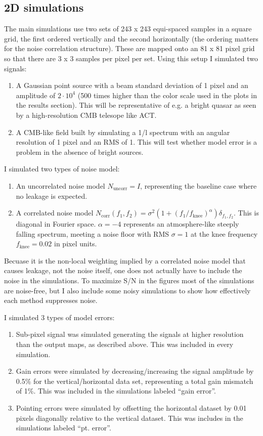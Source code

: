 \documentclass{article}
\begin{document}
\subsection{2D simulations}
The main simulations use two sets of 243 x 243 equi-spaced samples in a square grid,
the first ordered vertically and the second horizontally (the ordering matters for the
noise correlation structure). These are mapped onto an 81 x 81
pixel grid so that there are 3 x 3 samples per pixel per set. Using this setup I simulated
two signals:
\begin{enumerate}
	\item A Gaussian point source with a beam standard deviation of 1 pixel and an
amplitude of $2\cdot 10^4$ (500 times higher than the color scale used in the plots in the
results section). This will be representative of e.g. a bright quasar as seen by a high-resolution
CMB telesope like ACT.
	\item A CMB-like field built by simulating a 1/l spectrum with an angular
resolution of 1 pixel and an RMS of 1. This will test whether model error
is a problem in the absence of bright sources.
\end{enumerate}
I simulated two types of noise model:
\begin{enumerate}
	\item An uncorrelated noise model $N_\textrm{uncorr} = I$, representing the baseline case
		where no leakage is expected.
	\item A correlated noise model $N_\textrm{corr}(f_1,f_2) = \sigma^2 (1 + (f_1/f_\textrm{knee})^\alpha) \delta_{f_1,f_2}$. This is diagonal in Fourier space. $\alpha = -4$ represents an atmosphere-like steeply falling spectrum, meeting a noise floor with RMS $\sigma=1$ at the knee frequency $f_\textrm{knee} = 0.02$ in pixel units.
\end{enumerate}
Becuase it is the non-local weighting implied by a correlated noise model that causes leakage,
not the noise itself, one does not actually have to include the noise in the simulations.
To maximize S/N in the figures most of the simulations are noise-free, but I also include some noisy
simulations to show how effectively each method suppresses noise.

I simulated 3 types of model errors:
\begin{enumerate}
	\item Sub-pixel signal was simulated generating the signals at higher resolution than the
		output maps, as described above. This was included in every simulation.
	\item Gain errors were simulated by decreasing/increasing the signal amplitude by
	0.5\% for the vertical/horizontal data set, representing a total gain mismatch of
	1\%. This was included in the simulations labeled ``gain error''.
	\item Pointing errors were simulated by offsetting the horizontal dataset by 0.01
		pixels diagonally relative to the vertical dataset. This was includes in the
	simulations labeled ``pt. error''.
\end{enumerate}
\end{document}

